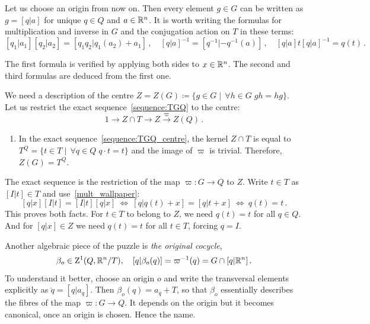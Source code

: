 Let us choose an origin from now on.
Then every element $g\in G$ can be written as $g =[q|a]$ for unique $q\in Q$ and $a\in {\mathbb R}^n$. It is worth writing the formulas for multiplication and inverse in $G$ and the conjugation action on $T$ in these terms:
\begin{equation} \label{mult_wallpaper}
  [q_1|a_1][q_2|a_2] =[q_1q_2|q_1(a_2)+a_1]\, , \quad 
  [q|a]^{-1}= [q^{-1}|-q^{-1}(a)]\, , \quad  [q|a]t[q|a]^{-1} = q(t) \, .
\end{equation}  
\begin{just}
  The first formula is verified by applying both sides to $x\in{\mathbb R}^n$.
The second and third formulas are deduced from the first one.
\end{just}  

We need a description of the centre $Z=Z(G) \coloneqq \{ g\in G \mid \, \forall h\in G \; gh=hg\}$.
Let us restrict the exact sequence~\eqref{sequence:TGQ} to the centre:
\begin{equation} \label{sequence:TGQ_centre}
  1 \to Z \cap T \to Z \xrightarrow{\varpi} Z(Q) \, .
\end{equation}  
\begin{enumerate}[resume, label=\textnormal{(\Roman*)}]
\item In the exact sequence~\eqref{sequence:TGQ_centre}, the kernel $Z\cap T$ is equal to $T^Q = \{ t\in T \mid \, \forall q\in Q \; q \cdot t = t \}$
  and the image of $\varpi$ is trivial.  Therefore, $Z(G) =T^Q$.
\end{enumerate}
\begin{just} The exact sequence is the restriction of the map $\varpi: G \to Q$ to $Z$. Write $t\in T$ as $[I|t]\in T$ and use~\eqref{mult_wallpaper}:
  \[ [q|x][I|t] = [I|t][q|x] \ \Leftrightarrow \  [q| q(t)+x]= [q| t+x] \ \Leftrightarrow \ q(t) = t \, .\]
  This proves both facts. For $t\in T$ to belong to $Z$, we need $q(t)=t$ for all $q\in Q$. And for
$[q|x]\in Z$ we need $q(t)=t$ for all $t\in T$, forcing $q=I$.  
\end{just}

Another algebraic piece of the puzzle is {\em the original cocycle}, 
    \[ \beta_{o} \in \mathrm{Z}^1 (Q,{\mathbb R}^n/T), \quad  [ q | \beta_o (q) ] = \varpi^{-1} (q) = G \cap [ q | {\mathbb R}^n ]\, . \]
    To understand it better, choose an origin $o$ and write the transversal elements explicitly as $\breve{q} = [q| a_q]$.
    Then $\beta_o (q) = a_q+T$, so that $\beta_o$ essentially describes the fibres of the map $\varpi : G \to Q$.
    It depends on the origin but it becomes canonical, once an origin is chosen. Hence the name.

